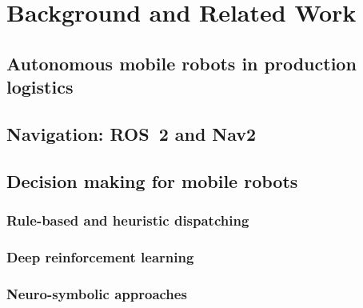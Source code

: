 \chapter{Background and Related Work}
\label{ch:background}


\section{Autonomous mobile robots in production logistics}
\label{sec:amr}

\section{Navigation: ROS~2 and Nav2}
\label{sec:nav2}

\section{Decision making for mobile robots}
\label{sec:decision-making}
\subsection{Rule-based and heuristic dispatching}
\subsection{Deep reinforcement learning}
\subsection{Neuro-symbolic approaches}

